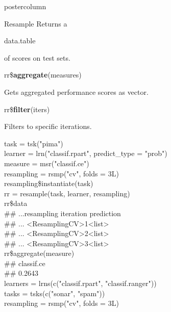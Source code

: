 \documentclass{beamer}
\newcommand{\codeinline}[1]{\begin{codeboxinline}#1\end{codeboxinline}}
\newcommand{\monospace}[1]{\multido{}{#1}{\space}}
\begin{document}
\begin{withoutheader}
\begin{frame}[fragile]{}
\begin{columns}
\begin{column}{.245\textwidth}
\begin{beamercolorbox}[center]{postercolumn}
\begin{minipage}{.98\textwidth}
{\begin{myblock}{Resample}
								Returns a \codeinline{data.table} of scores on test sets.
								\\
								\begin{codebox}
									rr\$\textbf{aggregate}(measures)
								\end{codebox}
								Gets aggregated performance scores as vector.
								\\
								\begin{codebox}
									rr\$\textbf{filter}(iters)
								\end{codebox}
								Filters to specific iterations.
								\\
								\begin{codeboxexample}
									\tiny{
										task = tsk("pima")\\
										learner = lrn("classif.rpart", predict\_type = "prob")\\
										measure = msr("classif.ce")
										\vspace{1em}
										\\
										resampling = rsmp("cv", folds = 3L)\\
										resampling\$instantiate(task)
										\vspace{1em}
										\\
										rr = resample(task, learner, resampling)
										\vspace{1em}
										\\
										rr\$data\\
										\#\# ...\monospace{3}resampling iteration prediction\\
										\#\# ... <ResamplingCV>\monospace{9}1\monospace{5}<list>\\
										\#\# ... <ResamplingCV>\monospace{9}2\monospace{5}<list>\\
										\#\# ... <ResamplingCV>\monospace{9}3\monospace{5}<list>
										\vspace{1em}
										\\
										rr\$aggregate(measure)\\
										\#\# classif.ce\\
										\#\# \monospace{4}0.2643
										\vspace{1em}
										\\
										learners = lrns(c("classif.rpart", "classif.ranger"))\\
										tasks = tsks(c("sonar", "spam"))\\
										resampling = rsmp("cv", folds = 3L)
										\vspace{1em}
}
\end{codeboxexample}
\end{myblock}}
\end{minipage}
\end{beamercolorbox}
\end{column}
\end{columns}
\end{frame}
\end{withoutheader}
\end{document}
